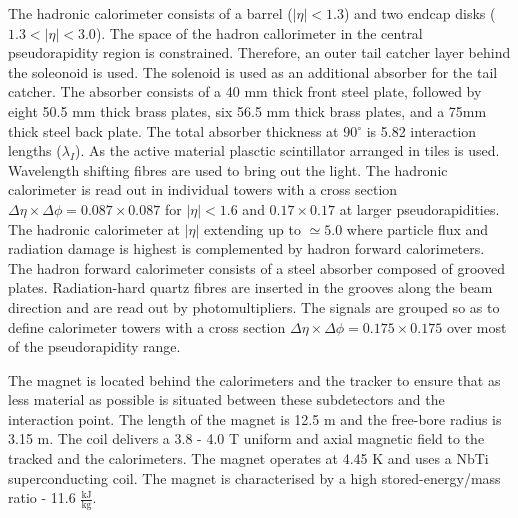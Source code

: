 The hadronic calorimeter \cite{HCAL_report} consists of a barrel ($\left|\eta\right| < 1.3 $) and two endcap disks ($1.3 < \left|\eta\right| < 3.0 $). The space of the hadron callorimeter in the central pseudorapidity region is constrained. Therefore, an outer tail catcher layer behind the soleonoid is used. The solenoid is used as an additional absorber for the tail catcher. The absorber consists of a 40 mm thick front steel plate, followed by eight 50.5 mm thick brass plates, six 56.5 mm thick brass plates, and a 75mm thick steel back plate. The total absorber thickness at 90$^{\circ}$ is 5.82 interaction lengths ($\lambda_{I}$). As the active material plasctic scintillator arranged in tiles is used. Wavelength shifting fibres are used to bring out the light. The hadronic calorimeter is read out in individual towers with a cross section $\Delta\eta\times\Delta\phi=0.087\times0.087$ for $\left|\eta\right|<1.6$ and $0.17\times0.17$ at larger pseudorapidities. The hadronic calorimeter at  $\left|\eta\right|$ extending up to $\simeq5.0$ where particle flux and radiation damage is highest is complemented by hadron forward calorimeters. The hadron forward calorimeter consists of a steel absorber composed of grooved plates. Radiation-hard quartz fibres are inserted in the grooves along the beam direction and are read out by photomultipliers. The signals are grouped so as to define calorimeter towers with a cross section $\Delta\eta\times\Delta\phi=0.175\times0.175$ over most of the pseudorapidity range. 

The magnet is located behind the calorimeters and the tracker to ensure that as less material as possible is situated between these subdetectors and the interaction point. The length of the magnet is 12.5 m and the free-bore radius is 3.15 m. The coil delivers a 3.8 - 4.0 T uniform and axial magnetic field to the tracked and the calorimeters. The magnet operates at 4.45 K and uses a NbTi superconducting coil. The magnet is characterised by a high stored-energy/mass ratio - 11.6 $\frac{\text{kJ}}{\text{kg}}$.

